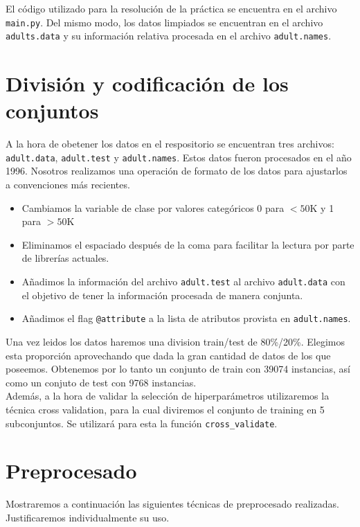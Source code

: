 \documentclass[11pt,a4paper]{article}
\begin{document}
El código utilizado para la resolución de la práctica se encuentra en el archivo \texttt{main.py}.  Del mismo modo, los datos limpiados se encuentran en el archivo \texttt{adults.data} y su información relativa procesada en el archivo \texttt{adult.names}.


\section{ División y codificación de los conjuntos}

A la hora de obetener los datos en el respositorio se encuentran tres archivos: \texttt{adult.data},  \texttt{adult.test} y \texttt{adult.names}. Estos datos fueron procesados en el año 1996. Nosotros realizamos una operación de formato de los datos para ajustarlos a convenciones más recientes.

\begin{itemize}
\item Cambiamos la variable de clase por valores categóricos 0 para $<50$K y 1 para $>50$K
\item Eliminamos el espaciado después de la coma para facilitar la lectura por parte de librerías actuales.
\item Añadimos la información del archivo \texttt{adult.test} al archivo \texttt{adult.data} con el objetivo de tener la información procesada de manera conjunta.
\item Añadimos el flag \texttt{@attribute} a la lista de atributos provista en \texttt{adult.names}.
\end{itemize}

Una vez leidos los datos haremos una division train/test de 80\%/20\%. Elegimos esta proporción aprovechando que dada la gran cantidad de datos de los que poseemos. Obtenemos por lo tanto un conjunto de train con 39074 instancias, así como un conjuto de test con 9768 instancias.\\

Además, a la hora de validar la selección de hiperparámetros utilizaremos la técnica cross validation, para la cual diviremos el conjunto de training en 5 subconjuntos. Se utilizará para esta la función \texttt{cross\_validate}\cite{cv}.




\section{Preprocesado}

Mostraremos a continuación las siguientes técnicas de preprocesado realizadas. Justificaremos individualmente su uso.
\end{document}

